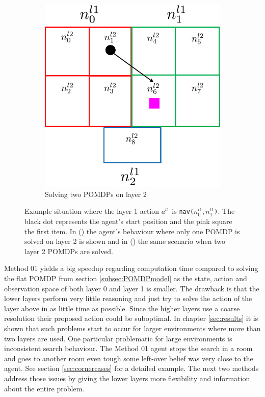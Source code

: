\begin{figure}
\begin{subfigure}[b]{0.45\textwidth}
        \includegraphics[width=\textwidth]{Report/images/two_terminal_states_shortroute.png}
        \caption{Solving two POMDPs on layer 2}
        \label{subfig:shortroute}
    \end{subfigure}
    \caption{Example situation where the layer 1 action $a^{l1}$ is \texttt{nav($n_0^{l1},n_1^{l1}$)}. The black dot represents the agent's start position and the pink square the first item. In () the agent's behaviour where only one POMDP is solved on layer 2 is shown and in () the same scenario when two layer 2 POMDPs are solved.}
    \label{fig:two_terminal_states}
\end{figure}

Method 01 yields a big speedup regarding computation time compared to solving the flat POMDP from section \ref{subsec:POMDPmodel} as the state, action and observation space of both layer 0 and layer 1 is smaller. The drawback is that the lower layers perform very little reasoning and just try to solve the action of the layer above in as little time as possible. Since the higher layers use a coarse resolution their proposed action could be suboptimal. In chapter \ref{sec:results} it is shown that such problems start to occur for larger environments where more than two layers are used. One particular problematic for large environments is inconsistent search behaviour. The Method 01 agent stops the search in a room and goes to another room even tough some left-over belief was very close to the agent. See section \ref{sec:cornercases} for a detailed example. 
The next two methods address those issues by giving the lower layers more flexibility and information about the entire problem.\\

